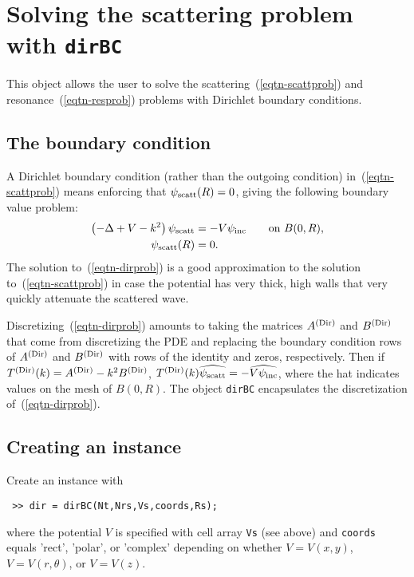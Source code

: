 \section{Solving the scattering problem with {\tt dirBC}}
\label{sec-dirBC}

This object allows the user to solve the
scattering~(\ref{eqtn-scattprob}) and
resonance~(\ref{eqtn-resprob}) problems with Dirichlet boundary
conditions.

\subsection{The boundary condition}
\label{sec-dirBC-BC}

A Dirichlet boundary condition (rather than the outgoing
condition) in~(\ref{eqtn-scattprob})
means enforcing that $\psi_{\text{scatt}}(R) = 0$, giving the following
boundary value problem:
\begin{equation}\label{eqtn-dirprob}
\begin{aligned}
 \left(-\Delta + V - k^2\right)\psi_{\text{scatt}} &= -V\psi_{\text{inc}}
 \qquad
 \text{on }B(0,R), \\
 \psi_{\text{scatt}}(R) &= 0.
\end{aligned} 
\end{equation}
The solution to~(\ref{eqtn-dirprob}) is a good approximation to
the solution to~(\ref{eqtn-scattprob}) in case the potential has 
very thick, high walls that very quickly attenuate the scattered wave.

Discretizing~(\ref{eqtn-dirprob}) amounts to taking the matrices $A^{(\text{Dir})}$
and $B^{(\text{Dir})}$ that come from discretizing the PDE and
replacing the boundary condition rows of $A^{(\text{Dir})}$ and $B^{(\text{Dir})}$ with
rows of the identity and zeros, respectively. 
Then if $T^{(\text{Dir})}(k) = A^{(\text{Dir})} - k^2 B^{(\text{Dir})}$, 
$T^{(\text{Dir})}(k)\widehat{\psi_{\text{scatt}}} = -\widehat{V\psi_{\text{inc}}}$,
where the hat indicates values on the mesh of $B(0,R)$.
The object
{\tt dirBC} encapsulates the discretization of~(\ref{eqtn-dirprob}).

\subsection{Creating an instance}
\label{sec-dirBC-create}

Create an instance with
\begin{verbatim}
 >> dir = dirBC(Nt,Nrs,Vs,coords,Rs);
\end{verbatim}
where the potential $V$ is specified with cell array {\tt Vs}
(see above) and {\tt coords} equals 'rect', 'polar', or 'complex'
depending on whether $V = V(x,y)$, $V = V(r,\theta)$, or
$V = V(z)$.

